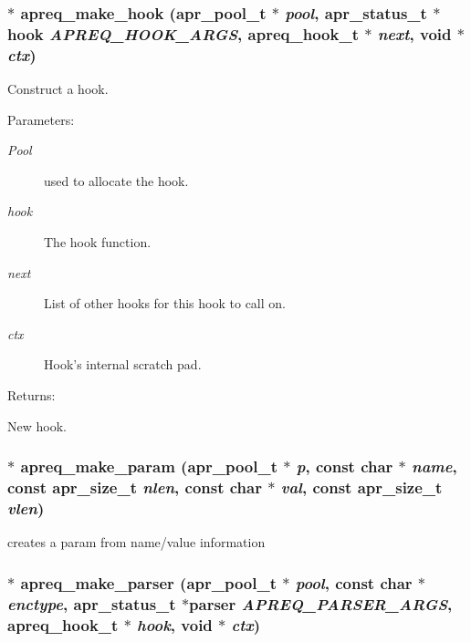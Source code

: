\subsubsection{$\ast$ apreq\_\-make\_\-hook ({\bf apr\_\-pool\_\-t} $\ast$ {\em pool}, {\bf apr\_\-status\_\-t} $\ast$hook {\em APREQ\_\-HOOK\_\-ARGS}, {\bf apreq\_\-hook\_\-t} $\ast$ {\em next}, {\bf void} $\ast$ {\em ctx})}\label{group__params_a19}


Construct a hook.\begin{Desc}
\item[Parameters: ]\par
\begin{description}
\item[{\em 
Pool}]used to allocate the hook. \item[{\em 
hook}]The hook function. \item[{\em 
next}]List of other hooks for this hook to call on. \item[{\em 
ctx}]Hook's internal scratch pad. \end{description}
\end{Desc}
\begin{Desc}
\item[Returns: ]\par
New hook. \end{Desc}
\subsubsection{$\ast$ apreq\_\-make\_\-param ({\bf apr\_\-pool\_\-t} $\ast$ {\em p}, const char $\ast$ {\em name}, const {\bf apr\_\-size\_\-t} {\em nlen}, const char $\ast$ {\em val}, const {\bf apr\_\-size\_\-t} {\em vlen})}\label{group__params_a4}


creates a param from name/value information 
\subsubsection{$\ast$ apreq\_\-make\_\-parser ({\bf apr\_\-pool\_\-t} $\ast$ {\em pool}, const char $\ast$ {\em enctype}, {\bf apr\_\-status\_\-t} $\ast$parser {\em APREQ\_\-PARSER\_\-ARGS}, {\bf apreq\_\-hook\_\-t} $\ast$ {\em hook}, {\bf void} $\ast$ {\em ctx})}\label{group__params_a18}


